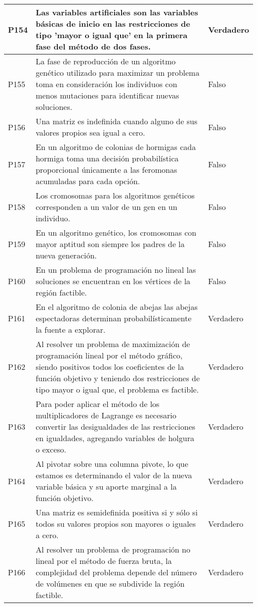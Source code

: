 \documentclass{article}
\begin{document}
\begin{longtable}{|>{\centering\arraybackslash}p{1.5cm}|>{\raggedright\arraybackslash}p{14cm}|>{\centering\arraybackslash}p{2cm}|}
\hline
P154 & Las variables artificiales son las variables básicas de inicio en las restricciones de tipo 'mayor o igual que' en la primera fase del método de dos fases. & Verdadero \\
\hline
P155 & La fase de reproducción de un algoritmo genético utilizado para maximizar un problema toma en consideración los individuos con menos mutaciones para identificar nuevas soluciones. & Falso \\
\hline
P156 & Una matriz es indefinida cuando alguno de sus valores propios sea igual a cero. & Falso \\
\hline
P157 & En un algoritmo de colonias de hormigas cada hormiga toma una decisión probabilística proporcional únicamente a las feromonas acumuladas para cada opción. & Falso \\
\hline
P158 & Los cromosomas para los algoritmos genéticos corresponden a un valor de un gen en un individuo. & Falso \\
\hline
P159 & En un algoritmo genético, los cromosomas con mayor aptitud son siempre los padres de la nueva generación. & Falso \\
\hline
P160 & En un problema de programación no lineal las soluciones se encuentran en los vértices de la región factible. & Falso \\
\hline
P161 & En el algoritmo de colonia de abejas las abejas espectadoras determinan probabilísticamente la fuente a explorar. & Verdadero \\
\hline
P162 & Al resolver un problema de maximización de programación lineal por el método gráfico, siendo positivos todos los coeficientes de la función objetivo y teniendo dos restricciones de tipo mayor o igual que, el problema es factible. & Verdadero \\
\hline
P163 & Para poder aplicar el método de los multiplicadores de Lagrange es necesario convertir las desigualdades de las restricciones en igualdades, agregando variables de holgura o exceso. & Verdadero \\
\hline
P164 & Al pivotar sobre una columna pivote, lo que estamos es determinando el valor de la nueva variable básica y su aporte marginal a la función objetivo. & Verdadero \\
\hline
P165 & Una matriz es semidefinida positiva si y sólo si todos su valores propios son mayores o iguales a cero. & Verdadero \\
\hline
P166 & Al resolver un problema de programación no lineal por el método de fuerza bruta, la complejidad del problema depende del número de volúmenes en que se subdivide la región factible. & Verdadero \\

\end{longtable}
\end{document}
